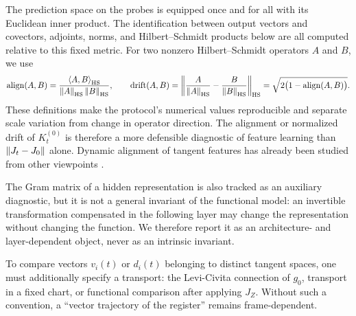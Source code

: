 The prediction space on the probes is equipped once and for all with its Euclidean inner product. The identification between output vectors and covectors, adjoints, norms, and Hilbert--Schmidt products below are all computed relative to this fixed metric. For two nonzero Hilbert--Schmidt operators $A$ and $B$, we use
\begin{equation}
\operatorname{align}(A,B)
=\frac{\left\langle A,B\right\rangle_{\rm HS}}{\left\lVert A\right\rVert_{\rm HS}\left\lVert B\right\rVert_{\rm HS}},
\qquad
\operatorname{drift}(A,B)
=\left\lVert \frac{A}{\left\lVert A\right\rVert_{\rm HS}}-\frac{B}{\left\lVert B\right\rVert_{\rm HS}}\right\rVert_{\rm HS}
=\sqrt{2\bigl(1-\operatorname{align}(A,B)\bigr)}.
\label{eq:alignment-drift}
\end{equation}
These definitions make the protocol's numerical values reproducible and separate scale variation from change in operator direction. The alignment or normalized drift of $K_t^{(0)}$ is therefore a more defensible diagnostic of feature learning than $\left\lVert J_t-J_0\right\rVert$ alone. Dynamic alignment of tangent features has already been studied from other viewpoints \citep{baratin2021}.

The Gram matrix of a hidden representation is also tracked as an auxiliary diagnostic, but it is not a general invariant of the functional model: an invertible transformation compensated in the following layer may change the representation without changing the function. We therefore report it as an architecture- and layer-dependent object, never as an intrinsic invariant.

To compare vectors $v_i(t)$ or $d_i(t)$ belonging to distinct tangent spaces, one must additionally specify a transport: the Levi-Civita connection of $g_0$, transport in a fixed chart, or functional comparison after applying $J_Z$. Without such a convention, a ``vector trajectory of the register'' remains frame-dependent.

